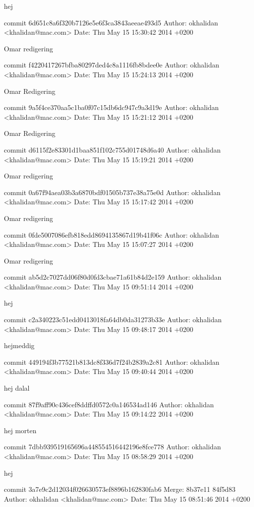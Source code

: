 \documentclass[12pt]{article}   %
\begin{document}
    hej

commit 6d651c8a6f320b7126e5e6f3ca3843aeeae493d5
Author: okhalidan <khalidan@mac.com>
Date:   Thu May 15 15:30:42 2014 +0200

    Omar redigering

commit f4220417267bfba80297ded4c8a1116fb8bdee0e
Author: okhalidan <khalidan@mac.com>
Date:   Thu May 15 15:24:13 2014 +0200

    Omar Redigering

commit 9a5f4ce370aa5c1ba0f07c15db6dc947c9a3d19e
Author: okhalidan <khalidan@mac.com>
Date:   Thu May 15 15:21:12 2014 +0200

    Omar Redigering

commit d6115f2e83301d1baa851f102c755d01748d6a40
Author: okhalidan <khalidan@mac.com>
Date:   Thu May 15 15:19:21 2014 +0200

    Omar redigering

commit 0a67f94aea03b3a6870bdf01505b737e38a75e0d
Author: okhalidan <khalidan@mac.com>
Date:   Thu May 15 15:17:42 2014 +0200

    Omar redigering

commit 0fde5007086efb818edd8694135867d19b41f06c
Author: okhalidan <khalidan@mac.com>
Date:   Thu May 15 15:07:27 2014 +0200

    Omar redigering

commit ab5d2c7027dd06f80d0fd3cbae71a61b84d2e159
Author: okhalidan <khalidan@mac.com>
Date:   Thu May 15 09:51:14 2014 +0200

    hej

commit c2a340223c51edd0413018fa64db0da31273b33e
Author: okhalidan <khalidan@mac.com>
Date:   Thu May 15 09:48:17 2014 +0200

    hejmeddig

commit 449194f3b77521b813dc8f336d7f24b2839a2c81
Author: okhalidan <khalidan@mac.com>
Date:   Thu May 15 09:40:44 2014 +0200

    hej dalal

commit 87f9aff90c436cef8ddffd0572c0a146534ad146
Author: okhalidan <khalidan@mac.com>
Date:   Thu May 15 09:14:22 2014 +0200

    hej morten

commit 7dbb939519165696a448554516442196e8fce778
Author: okhalidan <khalidan@mac.com>
Date:   Thu May 15 08:58:29 2014 +0200

    hej

commit 3a7e9c2d12034f026630573ef8896b162830fab6
Merge: 8b37e11 84f5d83
Author: okhalidan <khalidan@mac.com>
Date:   Thu May 15 08:51:46 2014 +0200
\end{document}

